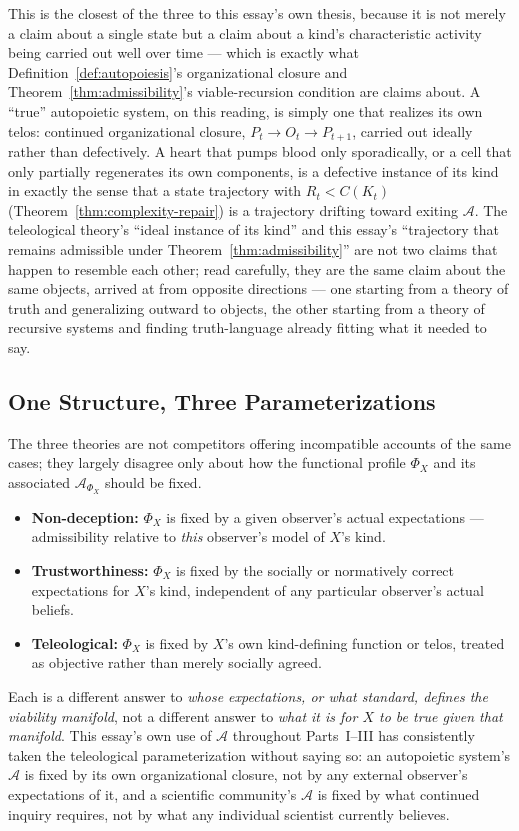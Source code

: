\documentclass[12pt,a4paper]{article}
\theoremstyle{plain}
\theoremstyle{definition}
\theoremstyle{remark}
\newcommand{\Adm}{\mathcal{A}}
\begin{document}
This is the closest of the three to this essay's own thesis, because it is not merely a claim about a single state but a claim about a kind's characteristic activity being carried out well over time — which is exactly what Definition~\ref{def:autopoiesis}'s organizational closure and Theorem~\ref{thm:admissibility}'s viable-recursion condition are claims about. A ``true'' autopoietic system, on this reading, is simply one that realizes its own telos: continued organizational closure, $P_t \to O_t \to P_{t+1}$, carried out ideally rather than defectively. A heart that pumps blood only sporadically, or a cell that only partially regenerates its own components, is a defective instance of its kind in exactly the sense that a state trajectory with $R_t < C(K_t)$ (Theorem~\ref{thm:complexity-repair}) is a trajectory drifting toward exiting $\Adm$. The teleological theory's ``ideal instance of its kind'' and this essay's ``trajectory that remains admissible under Theorem~\ref{thm:admissibility}'' are not two claims that happen to resemble each other; read carefully, they are the same claim about the same objects, arrived at from opposite directions — one starting from a theory of truth and generalizing outward to objects, the other starting from a theory of recursive systems and finding truth-language already fitting what it needed to say.

\subsection{One Structure, Three Parameterizations}
\label{subsec:one-structure-three}

The three theories are not competitors offering incompatible accounts of the same cases; they largely disagree only about how the functional profile $\Phi_X$ and its associated $\Adm_{\Phi_X}$ should be fixed.
\begin{itemize}
  \item \textbf{Non-deception:} $\Phi_X$ is fixed by a given observer's actual expectations — admissibility relative to \emph{this} observer's model of $X$'s kind.
  \item \textbf{Trustworthiness:} $\Phi_X$ is fixed by the socially or normatively correct expectations for $X$'s kind, independent of any particular observer's actual beliefs.
  \item \textbf{Teleological:} $\Phi_X$ is fixed by $X$'s own kind-defining function or telos, treated as objective rather than merely socially agreed.
\end{itemize}
Each is a different answer to \emph{whose expectations, or what standard, defines the viability manifold}, not a different answer to \emph{what it is for $X$ to be true given that manifold}. This essay's own use of $\Adm$ throughout Parts~I--III has consistently taken the teleological parameterization without saying so: an autopoietic system's $\Adm$ is fixed by its own organizational closure, not by any external observer's expectations of it, and a scientific community's $\Adm$ is fixed by what continued inquiry requires, not by what any individual scientist currently believes.
\end{document}
